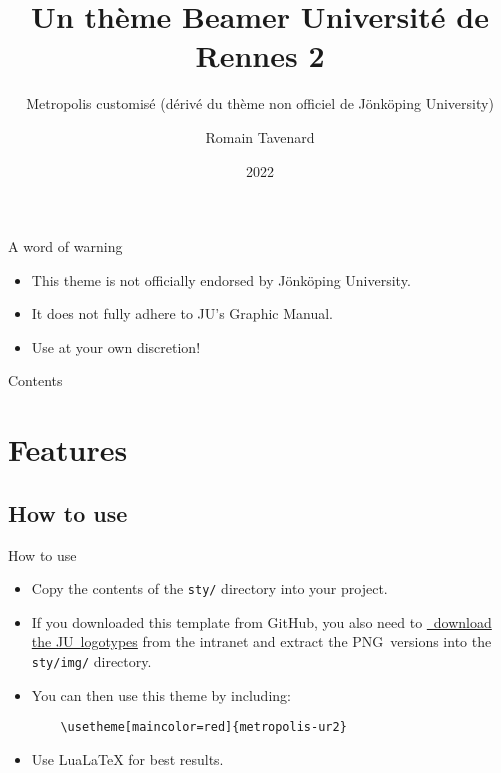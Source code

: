 \documentclass[10pt]{beamer}
\title[Thème Beamer UR2]{Un thème Beamer Université de Rennes 2}
\subtitle{Metropolis customisé (dérivé du thème non officiel de Jönköping University)}
\author{Romain Tavenard}
\date{2022}
\institute{%
\hypersetup{urlcolor=.}
\makebox[2.2ex][c]{\faEnvelope}\enspace\href{mailto:romain.tavenard@univ-rennes2.fr}{\texttt{romain.tavenard@univ-rennes2.fr}}\\%
\makebox[2.2ex][c]{\faHome}\enspace\url{https://rtavenar.github.io/}%
}
\begin{document}
\maketitle

\begin{frame}[stretch=3]{A word of warning}


  \begin{itemize}
    \item This theme is \alert{not officially endorsed} by Jönköping University.
    \item It does \alert{not fully adhere} to JU's Graphic Manual.
    \item Use at your own discretion!
  \end{itemize}
\end{frame}

\begin{frame}{Contents}
\twocol{\tableofcontents[sections={1-2}]}{\tableofcontents[sections={3-5}]}

\end{frame}


\section{Features}
\subsection{How to use}

\begin{frame}[fragile,stretch=3]{How to use}
  \begin{itemize}
    \item Copy the contents of the \texttt{sty/} directory into your project.
  
    \item If you downloaded this template from GitHub, you also need to \href{https://intranet.hj.se/intranet/en/service-and-support/marketing-and-communication/graphic-profile/logotypes.html}{{\small\faExternalLink*}~download the JU~logotypes} from the intranet and extract the PNG~versions into the \texttt{sty/img/} directory.
  
    \item You can then use this theme by including:\medskip
  
    \begin{verbatim}
    \usetheme[maincolor=red]{metropolis-ur2}
    \end{verbatim}
    
    \medskip
    \item \alert{Use LuaLaTeX for best results.}
  \end{itemize}
\end{frame}
\end{document}
